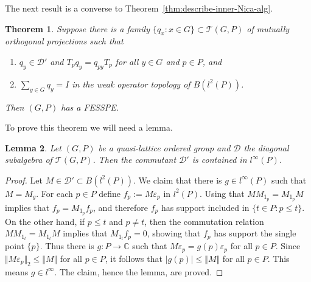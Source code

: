 \documentclass[12pt]{amsart}
\theoremstyle{plain}
\newtheorem{theorem}{Theorem}[section]
\newtheorem{lemma}[theorem]{Lemma}
\theoremstyle{remark}
\theoremstyle{definition}
\numberwithin{equation}{section}
\theoremstyle{plain}
\theoremstyle{definition}
\theoremstyle{remark}
\begin{document}
The next result is a converse to Theorem~\ref{thm:describe-inner-Nica-alg}.

\begin{theorem}\label{thm:inner-to-FES} Suppose there is a family $\{q_x: x\in G\}\subset {\mathcal T}(G, P)$ of mutually orthogonal
projections such that
\begin{enumerate}
\item $q_y\in {\mathcal D}'$ and $T_pq_y=q_{py}T_p$ for all $y\in G$ and $p\in P$, and
\item $\sum_{y\in G}q_y=I$ in the weak operator topology of $B(l^2(P))$.
\end{enumerate}
Then $(G, P)$ has a {FESSPE}.
\end{theorem}

To prove this theorem we will need a lemma.

\begin{lemma}\label{lem:Toe-mult-free}
Let $(G, P)$ be a quasi-lattice ordered group and ${\mathcal D}$ the diagonal
subalgebra of ${\mathcal T}(G, P)$. Then the commutant ${\mathcal D}'$ is contained in $l^\infty(P)$.
\end{lemma}

\begin{proof}
Let $M\in {\mathcal D}'\subset B(l^2(P))$.  We claim that there is $g\in l^\infty(P)$ such that $M=M_g$.
For each $p\in P$ define $f_p:=M\varepsilon_p$ in $l^2(P)$. Using that $MM_{1_p}=M_{1_p}M$
implies that $f_p=M_{1_p}f_p$, and therefore $f_p$ has support included in $\{t\in P: p\leq t\}$.
On the other hand, if $p\leq t$ and $p\neq t$, then the commutation relation $MM_{1_t}=M_{1_t}M$
implies that $M_{1_t}f_p=0$, showing that $f_p$ has support the single point $\{p\}$. Thus there is
$g:P\to {{\mathbb{{C}}}}$ such that $M\varepsilon_p=g(p)\varepsilon_p$ for all $p\in P$. Since $\Vert M\varepsilon_p\Vert_2\leq \Vert M\Vert$
for all $p\in P$, it follows that $\vert g(p)\vert\leq \Vert M\Vert$ for all $p\in P$. This means $g\in l^\infty$. The claim,
hence the lemma, are proved.
\end{proof}
\end{document}

